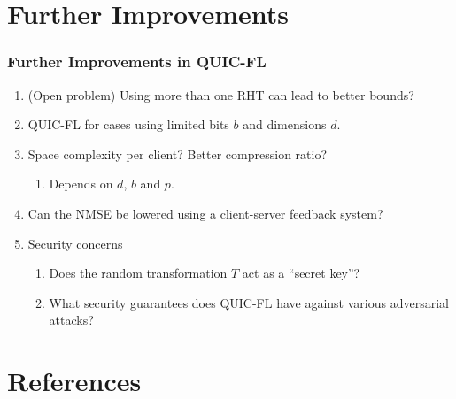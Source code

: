 \documentclass{beamer}
\begin{document}
    \section{Further Improvements}
    \begin{frame}
        \frametitle{Further Improvements in QUIC-FL}    
        \begin{enumerate}
            \item (Open problem) Using more than one RHT can lead to better
            bounds?
            \item QUIC-FL for cases using limited bits \(b\) and dimensions
            \(d\).
            \item Space complexity per client? Better compression ratio?
            \begin{enumerate}
                \item Depends on \(d\), \(b\) and \(p\).
            \end{enumerate}
            \item Can the NMSE be lowered using a client-server feedback system?
            \item Security concerns
            \begin{enumerate}
                \item Does the random transformation \(T\) act as a ``secret
                key''?
                \item What security guarantees does QUIC-FL have against various
                adversarial attacks?
            \end{enumerate}
        \end{enumerate}
    \end{frame}

    \section{References}
    \begin{frame}[allowframebreaks]
        
    \end{frame}
\end{document}
